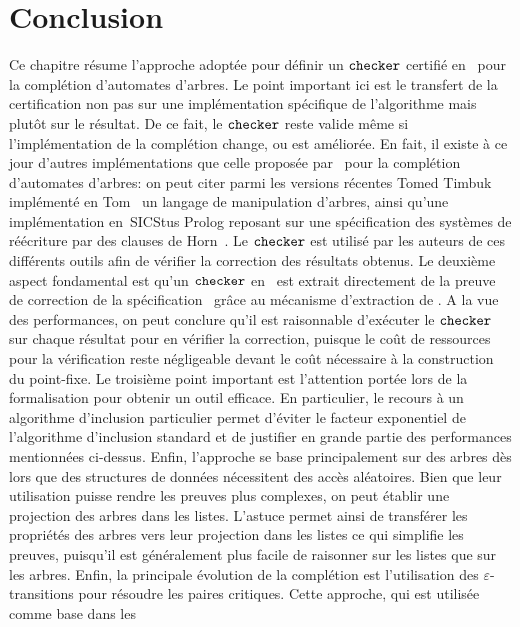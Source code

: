 \section{Conclusion}
\label{sec:conclusion}
Ce chapitre résume l'approche adoptée pour définir un $\mathtt{checker}$ certifié en \coq\ 
pour la complétion d'automates d'arbres. Le point important ici est le transfert
de la certification non pas sur une implémentation spécifique de l'algorithme
mais plutôt sur le résultat. De ce fait, le $\mathtt{checker}$ reste valide même si l'implémentation
de la complétion change, ou est améliorée. En fait, il existe à ce jour d'autres implémentations
que celle proposée par \timbuk\ pour la complétion d'automates d'arbres: on peut citer parmi les versions
récentes \textsf{Tomed Timbuk}~\cite{BallandBGM-AMAST08} implémenté en Tom~\cite{TOM} un langage de manipulation
d'arbres, ainsi qu'une implémentation en~\textsf{SICStus Prolog} reposant sur une spécification des systèmes
de réécriture par des clauses de Horn~\cite{GallagherR-LPAR08}. Le $\mathtt{checker}$ est utilisé par les auteurs
de ces différents outils afin de vérifier la correction des résultats obtenus. 
Le deuxième aspect fondamental est qu'un $\mathtt{checker}$ en \ocaml\ est extrait directement de la preuve
de correction de la spécification \coq\ grâce au mécanisme d'extraction de \coq.
A la vue des performances, on peut conclure qu'il est raisonnable d'exécuter le $\mathtt{checker}$ sur chaque résultat pour en vérifier
la correction, puisque le coût de ressources pour la vérification reste négligeable devant le coût nécessaire
à la construction du point-fixe.
Le troisième point important est l'attention portée lors de la formalisation pour obtenir un
outil efficace. En particulier, le recours à un algorithme d'inclusion
particulier permet d'éviter le facteur exponentiel de l'algorithme d'inclusion standard et de justifier en 
grande partie des performances mentionnées ci-dessus. Enfin, l'approche se base principalement sur
des arbres dès lors que des structures de données nécessitent des accès aléatoires. Bien que leur utilisation puisse rendre les preuves plus complexes, on peut établir
une projection des arbres dans les listes. L'astuce permet ainsi de transférer les propriétés 
des arbres vers leur projection dans les listes ce qui simplifie les preuves, puisqu'il est généralement
plus facile de raisonner sur les listes que sur les arbres.
Enfin, la principale évolution de la complétion est l'utilisation des $\varepsilon$-transitions 
pour résoudre les paires critiques. Cette approche, qui est utilisée comme base dans les
